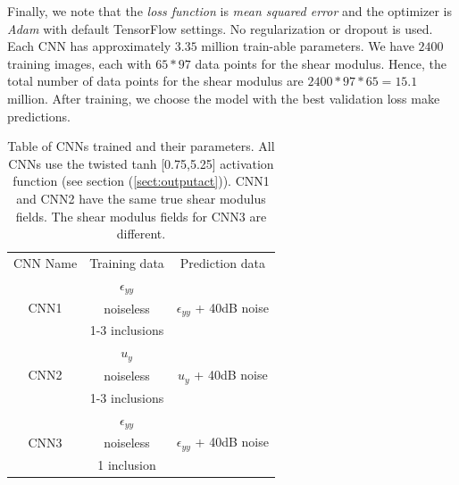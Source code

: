 \documentclass[10pt]{article}
\begin{document}
Finally, we note that the \textit{loss function} is \textit{mean squared error} and the optimizer is \textit{Adam} \cite{misc:kingma2017adam} with default TensorFlow settings. No regularization or dropout is used.  Each CNN has approximately $3.35$ million train-able parameters. We have $2400$ training images, each with $65*97$ data points for the shear modulus. Hence, the total number of data points for the shear modulus are $2400*97*65=15.1$ million. After training, we choose the model with the best validation loss make predictions.
%
\begin{center}
\begin{table}
  \centering
  \begin{tabular}{|c|c|c|}
    \hline
    \multirow{2}{*}{CNN Name} &  \multirow{2}{*}{Training data}           & \multirow{2}{*}{Prediction data}\\
                              &                                           &  \\
     \hline
     \multirow{3}{*}{CNN1}    &  $\epsilon_{yy}$                           &  \multirow{3}{*}{$\epsilon_{yy}$ + 40dB noise}\\
                              &  noiseless                                & \\
                              &  1-3 inclusions                           &\\
     \hline
     \multirow{3}{*}{CNN2}    &  $u_{y}$                                   & \multirow{3}{*}{$u_{y}$ + 40dB noise}\\
                              &  noiseless                                & \\
                              &  1-3 inclusions                           &\\  
     \hline
     \multirow{3}{*}{CNN3}    &  $\epsilon_{yy}$                           & \multirow{3}{*}{$\epsilon_{yy}$ + 40dB noise}\\
                              &  noiseless                                & \\
                              &  1 inclusion                              & \\

    \hline
  \end{tabular}
  \caption{\label{table:cnnparams} Table of CNNs trained and their parameters. All CNNs use the twisted tanh [0.75,5.25] activation function (see section (\ref{sect:outputact})). CNN1 and CNN2 have the same true shear modulus fields. The shear modulus fields for CNN3 are different.}
\end{table}
\end{center}
%
\end{document}
